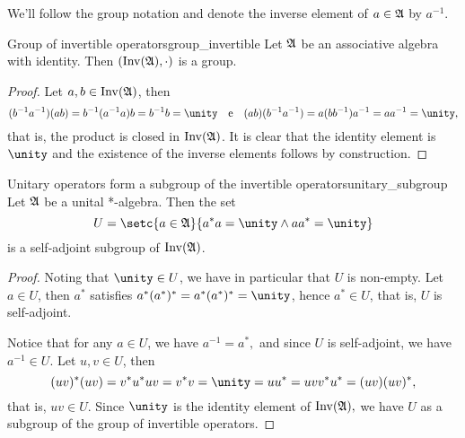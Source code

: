 We'll follow the group notation and denote the inverse element of \(a \in \mathfrak{A}\) by \(a^{-1}\).
\begin{proposition}{Group of invertible operators}{group_invertible}
    Let \(\mathfrak{A}\) be an associative algebra with identity. Then \((\operatorname{Inv}(\mathfrak{A}), \cdot)\) is a group.
\end{proposition}
\begin{proof}
    Let \(a, b \in \operatorname{Inv}(\mathfrak{A})\), then
    \begin{equation*}
        (b^{-1} a^{-1}) (ab) = b^{-1} (a^{-1}a)b = b^{-1}b = \unity\quad\text{e}\quad
        (ab) (b^{-1} a^{-1}) = a(bb^{-1})a^{-1} = aa^{-1} = \unity,
    \end{equation*}
    that is, the product is closed in \(\operatorname{Inv}(\mathfrak{A})\). It is clear that the identity element is \(\unity\) and the existence of the inverse elements follows by construction.
\end{proof}
\begin{proposition}{Unitary operators form a subgroup of the invertible operators}{unitary_subgroup}
    Let \(\mathfrak{A}\) be a unital *-algebra. Then the set
    \begin{equation*}
        U = \setc{a \in \algebra{A}}{a^*a = \unity \land aa^* = \unity}
    \end{equation*}
     is a self-adjoint subgroup of \(\operatorname{Inv}(\mathfrak{A})\).
\end{proposition}
\begin{proof}
    Noting that \(\unity \in U\), we have in particular that \(U\) is non-empty. Let \(a \in U\), then \(a^*\) satisfies \(a^*(a^*)^* = a^*(a^*)^*= \unity\), hence \(a^* \in U\), that is, \(U\) is self-adjoint.

    Notice that for any \(a \in U\), we have \(a^{-1} = a^*,\) and since \(U\) is self-adjoint, we have \(a^{-1} \in U\). Let \(u,v \in U\), then
    \begin{equation*}
        (uv)^*(uv) = v^*u^*uv = v^* v = \unity = uu^* = uvv^*u^* = (uv)(uv)^*,
    \end{equation*}
    that is, \(uv \in U\). Since \(\unity\) is the identity element of \(\operatorname{Inv}(\mathfrak{A}),\) we have \(U\) as a subgroup of the group of invertible operators.
\end{proof}

